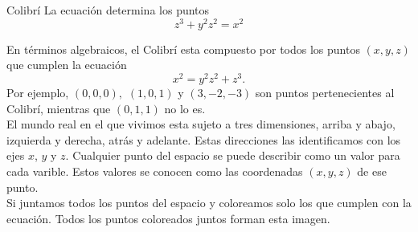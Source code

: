 \begin{surferPage}{Colibrí}
La ecuación determina los puntos\\
  
  \smallskip
\[z^3+ y^2	z^2	= x^2\]

\singlespacing
En términos algebraicos, el Colibrí esta compuesto por todos los puntos $(x, y, z)$ que cumplen la ecuación
\smallskip
\[ x^2= y^2z^2+z^3.\]
\smallskip
Por ejemplo, $(0,0,0),$ $(1,0,1)$ y $(3,-2,-3)$ son puntos pertenecientes al Colibrí, mientras que $(0,1,1)$ no lo es.\\
 \singlespacing
El mundo real en el que vivimos esta sujeto a tres dimensiones, arriba y abajo, izquierda y derecha, atrás y adelante. Estas direcciones las identificamos con los ejes $x$, $y$ y $z$. Cualquier punto del espacio se puede describir como un valor para cada varible. Estos valores se conocen como las coordenadas $(x,y,z)$ de ese punto.\\
\singlespacing
Si juntamos todos los puntos del espacio y coloreamos solo los que cumplen con la ecuación. Todos los puntos coloreados juntos forman esta imagen.
\end{surferPage}
